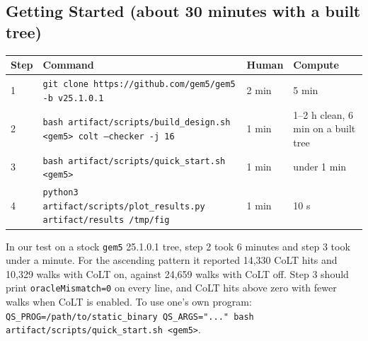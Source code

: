 \subsection{Getting Started (about 30 minutes with a built tree)}
\begin{table}[H]
\centering
\small
\begin{tabularx}{\textwidth}{l X l l}
\toprule
\textbf{Step} & \textbf{Command} & \textbf{Human} & \textbf{Compute} \\
\midrule
1 & \texttt{git clone https://github.com/gem5/gem5 -b v25.1.0.1} & 2 min & 5 min \\
2 & \texttt{bash artifact/scripts/build\_design.sh <gem5> colt --checker -j 16} & 1 min & 1--2 h clean, 6 min on a built tree \\
3 & \texttt{bash artifact/scripts/quick\_start.sh <gem5>} & 1 min & under 1 min \\
4 & \texttt{python3 artifact/scripts/plot\_results.py artifact/results /tmp/fig} & 1 min & 10 s \\
\bottomrule
\end{tabularx}
\end{table}

\noindent In our test on a stock \texttt{gem5} 25.1.0.1 tree, step 2 took 6 minutes and step 3 took under a minute. For the ascending pattern it reported 14,330 CoLT hits and 10,329 walks with CoLT on, against 24,659 walks with CoLT off. Step 3 should print \texttt{oracleMismatch=0} on every line, and CoLT hits above zero with fewer walks when CoLT is enabled. To use one's own program: \texttt{QS\_PROG=/path/to/static\_binary QS\_ARGS="..." bash artifact/scripts/quick\_start.sh <gem5>}.

